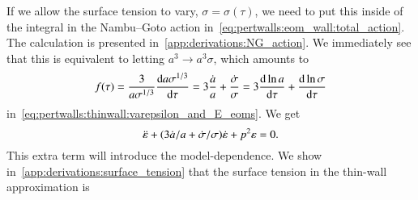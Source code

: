     If we allow the surface tension to vary, $\sigma=\sigma(\tau)$, %
    we need to put this inside of the integral in the Nambu--Goto action in~\cref{eq:pertwalls:eom_wall:total_action}. The calculation is presented in~\cref{app:derivations:NG_action}. We immediately see that this is equivalent to letting $a^3\to a^3 \sigma$, which amounts to 
    \begin{equation}
        f(\tau) = \frac{3}{a\sigma^{1/3}} \dv{a\sigma^{1/3}}{\tau} =  3\frac{\dot{a}}{a} +  \frac{\dot{\sigma}}{\sigma} = 3\dv{\ln{a}}{\tau} + \dv{\ln{\sigma}}{\tau}
    \end{equation}
    in~\cref{eq:pertwalls:thinwall:varepsilon_and_E_eoms}. We get
    \begin{equation}
        \ddot{\varepsilon} + {\left( 3\dot{a}/a + \dot{\sigma}/\sigma \right)}\dot{\varepsilon} +p^2 \varepsilon = 0.
    \end{equation}
    This extra term will introduce the model-dependence. We show in~\cref{app:derivations:surface_tension} that the surface tension in the thin-wall approximation is 
